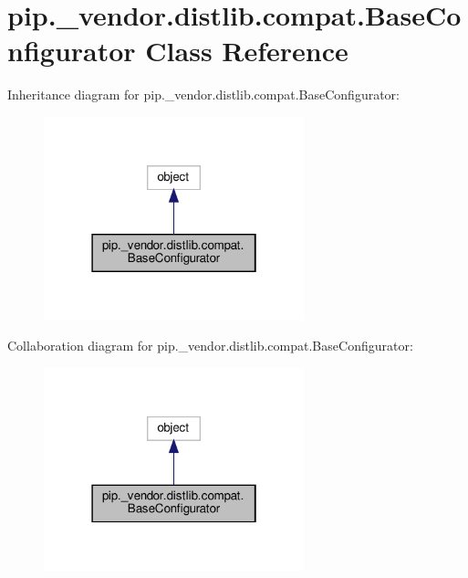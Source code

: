 \hypertarget{classpip_1_1__vendor_1_1distlib_1_1compat_1_1BaseConfigurator}{}\section{pip.\+\_\+vendor.\+distlib.\+compat.\+Base\+Configurator Class Reference}
\label{classpip_1_1__vendor_1_1distlib_1_1compat_1_1BaseConfigurator}


Inheritance diagram for pip.\+\_\+vendor.\+distlib.\+compat.\+Base\+Configurator\+:
\nopagebreak
\begin{figure}[H]
\begin{center}
\leavevmode
\includegraphics[width=214pt]{classpip_1_1__vendor_1_1distlib_1_1compat_1_1BaseConfigurator__inherit__graph}
\end{center}
\end{figure}


Collaboration diagram for pip.\+\_\+vendor.\+distlib.\+compat.\+Base\+Configurator\+:
\nopagebreak
\begin{figure}[H]
\begin{center}
\leavevmode
\includegraphics[width=214pt]{classpip_1_1__vendor_1_1distlib_1_1compat_1_1BaseConfigurator__coll__graph}
\end{center}
\end{figure}
